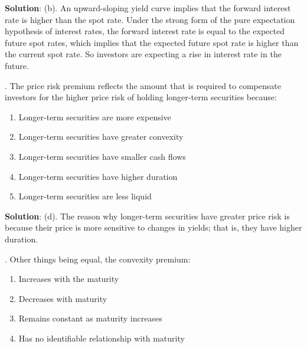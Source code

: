 \documentclass[11.5pt]{article}
\begin{document}
\noindent \textbf{Solution}: (b). An upward-sloping yield curve implies that the forward interest rate is higher than the spot rate. Under the strong form of the pure expectation hypothesis of interest rates, the forward interest rate is equal to the expected future spot rates, which implies that the expected future spot rate is higher than the current spot rate. So investors are expecting a rise in interest rate in the future.

\vspace{30pt}





. The price risk premium reflects the amount that is required to compensate investors for the higher price risk of holding longer-term securities because:

\begin{enumerate}[a]
	
	\item Longer-term securities are more expensive
	
	\item Longer-term securities have greater convexity
	
	\item Longer-term securities have smaller cash flows
	
	\item Longer-term securities have higher duration
	
	\item Longer-term securities are less liquid
\end{enumerate}



\noindent \textbf{Solution}: (d). The reason why longer-term securities have greater price risk is because their price is more sensitive to changes in yields; that is, they have higher duration.

\vspace{30pt}





\newpage


. Other things being equal, the convexity premium:

\begin{enumerate}[a]
	
	\item Increases with the maturity
	
	\item Decreases with maturity
	
	\item Remains constant as maturity increases
	
	\item Has no identifiable relationship with maturity
\end{enumerate}
\end{document}
